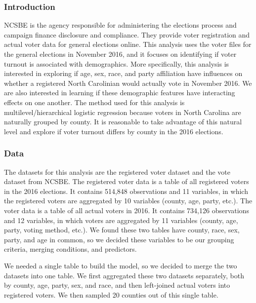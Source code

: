 \documentclass[
]{article}
\begin{document}
\hypertarget{introduction-1}{%
\subsubsection{Introduction}\label{introduction-1}}

NCSBE is the agency responsible for administering the elections process
and campaign finance disclosure and compliance. They provide voter
registration and actual voter data for general elections online. This
analysis uses the voter files for the general elections in November
2016, and it focuses on identifying if voter turnout is associated with
demographics. More specifically, this analysis is interested in
exploring if age, sex, race, and party affiliation have influences on
whether a registered North Carolinian would actually vote in November
2016. We are also interested in learning if these demographic features
have interacting effects on one another. The method used for this
analysis is multilevel/hierarchical logistic regression because voters
in North Carolina are naturally grouped by county. It is reasonable to
take advantage of this natural level and explore if voter turnout
differs by county in the 2016 elections.

\hypertarget{data}{%
\subsubsection{Data}\label{data}}

The datasets for this analysis are the registered voter dataset and the
vote dataset from NCSBE. The registered voter data is a table of all
registered voters in the 2016 elections. It contains 514,848
observations and 11 variables, in which the registered voters are
aggregated by 10 variables (county, age, party, etc.). The voter data is
a table of all actual voters in 2016. It contains 734,126 observations
and 12 variables, in which voters are aggregated by 11 variables
(county, age, party, voting method, etc.). We found these two tables
have county, race, sex, party, and age in common, so we decided these
variables to be our grouping criteria, merging conditions, and
predictors.

We needed a single table to build the model, so we decided to merge the
two datasets into one table. We first aggregated these two datasets
separately, both by county, age, party, sex, and race, and then
left-joined actual voters into registered voters. We then sampled 20
counties out of this single table.
\end{document}
